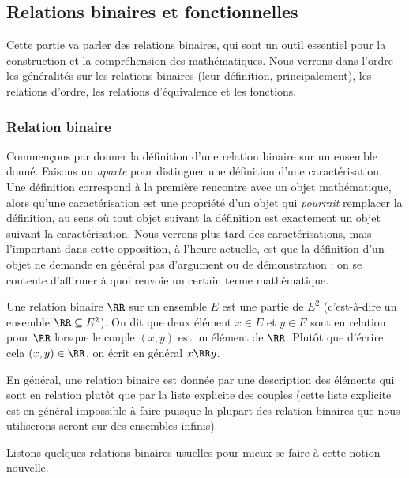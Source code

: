 \subsection{Relations binaires et fonctionnelles}

Cette partie va parler des relations binaires, qui sont un outil essentiel pour la construction et la compréhension des mathématiques. Nous verrons dans l'ordre les généralités sur les relations binaires (leur définition, principalement), les relations d'ordre, les relations d'équivalence et les fonctions.

\subsubsection{Relation binaire}

Commençons par donner la définition d'une relation binaire sur un ensemble donné. Faisons un \textit{aparte} pour distinguer une définition d'une caractérisation. Une définition correspond à la première rencontre avec un objet mathématique, alors qu'une caractérisation est une propriété d'un objet qui \textit{pourrait} remplacer la définition, au sens où tout objet suivant la définition est exactement un objet suivant la caractérisation. Nous verrons plus tard des caractérisations, mais l'important dans cette opposition, à l'heure actuelle, est que la définition d'un objet ne demande en général pas d'argument ou de démonstration : on se contente d'affirmer à quoi renvoie un certain terme mathématique.

\begin{defi}
    Une relation binaire $\RR$ sur un ensemble $E$ est une partie de $E^2$ (c'est-à-dire un ensemble $\RR\subseteq E^2$). On dit que deux élément $x\in E$ et $y\in E$ sont en relation pour $\RR$ lorsque le couple $(x,y)$ est un élément de $\RR$. Plutôt que d'écrire cela $(x,y)\in\RR$, on écrit en général $x\RR y$.
    
    En général, une relation binaire est donnée par une description des éléments qui sont en relation plutôt que par la liste explicite des couples (cette liste explicite est en général impossible à faire puisque la plupart des relation binaires que nous utiliserons seront sur des ensembles infinis).
\end{defi}

Listons quelques relations binaires usuelles pour mieux se faire à cette notion nouvelle.

